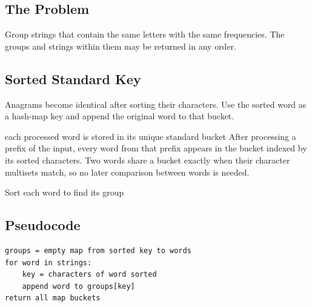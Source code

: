 
\subsection{The Problem}
Group strings that contain the same letters with the same frequencies. The
groups and strings within them may be returned in any order.

\subsection{Sorted Standard Key}
Anagrams become identical after sorting their characters. Use the sorted word
as a hash-map key and append the original word to that bucket.

\begin{invariantbox}{each processed word is stored in its unique standard bucket}
After processing a prefix of the input, every word from that prefix appears in
the bucket indexed by its sorted characters. Two words share a bucket exactly
when their character multisets match, so no later comparison between words is
needed.
\end{invariantbox}

\begin{visualbox}{Sort each word to find its group}
\centering
{}
\end{visualbox}

\subsection{Pseudocode}
\begin{lstlisting}[style=pseudocode]
groups = empty map from sorted key to words
for word in strings:
    key = characters of word sorted
    append word to groups[key]
return all map buckets
\end{lstlisting}

